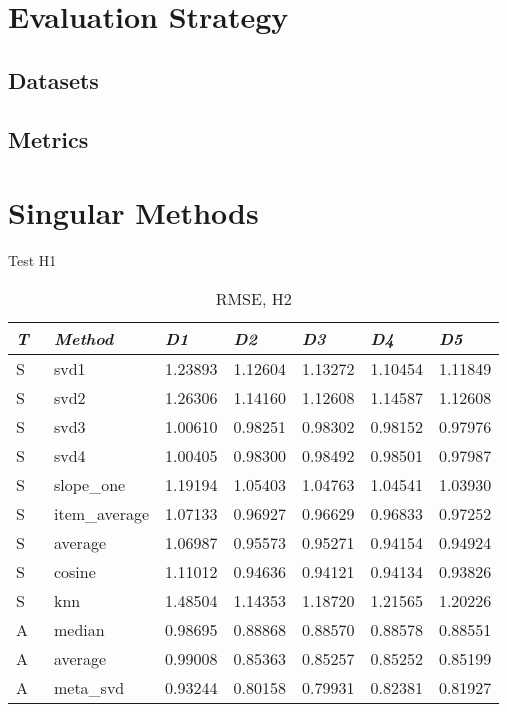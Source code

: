 \label{chap:results}

\section{Evaluation Strategy}
\subsection{Datasets}
\subsection{Metrics}

\section{Singular Methods}

Test H1

\begin{table}
  \begin{tabular*}{\textwidth}{ l p{3cm} p{1.5cm} p{1.5cm} p{1.5cm} p{1.5cm} p{1.5cm} }
    \toprule
      \emph{T} & \emph{Method} & 
      \emph{D1} & \emph{D2} & \emph{D3} & \emph{D4} & \emph{D5}\\ 
    \midrule
    S & svd1          & 1.23893	  & 1.12604	  & 1.13272	  & 1.10454	  & 1.11849	 \\
    S & svd2          & 1.26306	  & 1.14160   & 1.12608	  & 1.14587	  & 1.12608	 \\
    S & svd3          & 1.00610	  & 0.98251	  & 0.98302	  & 0.98152	  & 0.97976	 \\
    S & svd4          & 1.00405	  & 0.98300	  & 0.98492	  & 0.98501	  & 0.97987	 \\
    S & slope\_one    & 1.19194	  & 1.05403	  & 1.04763	  & 1.04541	  & 1.03930  \\
    S & item\_average & 1.07133	  & 0.96927	  & 0.96629	  & 0.96833	  & 0.97252	 \\
    S & average       & 1.06987	  & 0.95573	  & 0.95271	  & 0.94154	  & 0.94924	 \\
    S & cosine   	    & 1.11012	  & 0.94636	  & 0.94121	  & 0.94134	  & 0.93826	 \\
    S & knn       	  & 1.48504	  & 1.14353	  & 1.18720   & 1.21565	  & 1.20226	 \\
    \midrule                                                                    
    A & median    	  & 0.98695	  & 0.88868	  & 0.88570   & 0.88578	  & 0.88551	 \\
    A & average    	  & 0.99008	  & 0.85363	  & 0.85257	  & 0.85252	  & 0.85199	 \\
    A & meta\_svd     & 0.93244	  & 0.80158	  & 0.79931	  & 0.82381	  & 0.81927	 \\
    \bottomrule
  \end{tabular*}
  \caption[Results]{RMSE, H2}
  \label{table:results:h2}
\end{table}


